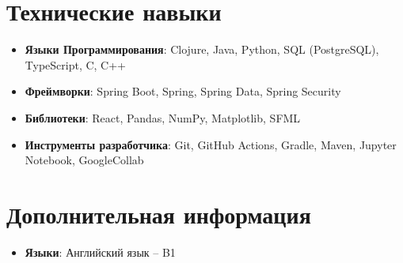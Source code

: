 \documentclass[letterpaper,11pt]{article}
\newcommand{\resumeItem}[2]{
  \item\small{
    \textbf{#1}{: #2 \vspace{-2pt}}
  }
}
\newcommand{\resumeSubItem}[2]{\resumeItem{#1}{#2}\vspace{-4pt}}
\newcommand{\resumeSubHeadingListStart}{\begin{itemize}[leftmargin=*]}
\newcommand{\resumeSubHeadingListEnd}{\end{itemize}}
\begin{document}
\section{Технические навыки}
\resumeSubHeadingListStart
\resumeSubItem{Языки Программирования}{Clojure, Java, Python, SQL (PostgreSQL), TypeScript, C, C++}
\resumeSubItem{Фреймворки}{Spring Boot, Spring, Spring Data, Spring Security}
\resumeSubItem{Библиотеки}{React, Pandas, NumPy, Matplotlib, SFML}
\resumeSubItem{Инструменты разработчика}{Git, GitHub Actions, Gradle, Maven, Jupyter Notebook, GoogleCollab}
\resumeSubHeadingListEnd
\section{Дополнительная информация}
\resumeSubHeadingListStart
\resumeSubItem{Языки}{Английский язык -- B1}
\resumeSubHeadingListEnd
\end{document}
